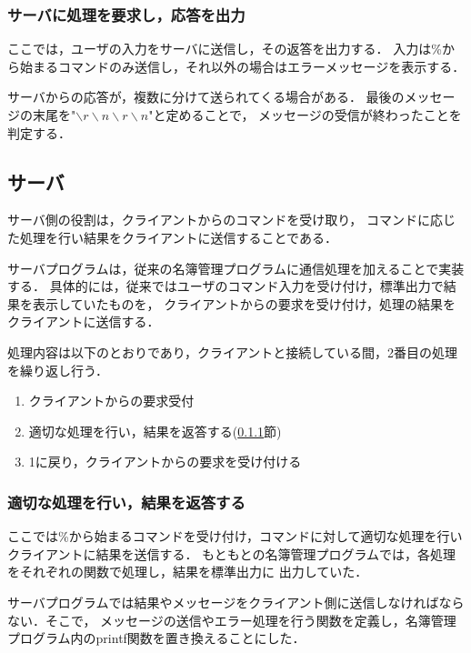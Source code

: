 \documentclass[11pt]{jarticle}
\begin{document}
\subsubsection{サーバに処理を要求し，応答を出力} \label{sec:process}

ここでは，ユーザの入力をサーバに送信し，その返答を出力する．
入力は\%から始まるコマンドのみ送信し，それ以外の場合はエラーメッセージを表示する．

サーバからの応答が，複数に分けて送られてくる場合がある．
最後のメッセージの末尾を"$\backslash r\backslash n\backslash r\backslash n$"と定めることで，
メッセージの受信が終わったことを判定する．

\subsection{サーバ}

サーバ側の役割は，クライアントからのコマンドを受け取り，
コマンドに応じた処理を行い結果をクライアントに送信することである．

サーバプログラムは，従来の名簿管理プログラムに通信処理を加えることで実装する．
具体的には，従来ではユーザのコマンド入力を受け付け，標準出力で結果を表示していたものを，
クライアントからの要求を受け付け，処理の結果をクライアントに送信する．

処理内容は以下のとおりであり，クライアントと接続している間，2番目の処理を繰り返し行う．

\begin{enumerate}
    \item クライアントからの要求受付
    \item 適切な処理を行い，結果を返答する(\ref{sec:response}節)
    \item 1に戻り，クライアントからの要求を受け付ける
\end{enumerate}


\subsubsection{適切な処理を行い，結果を返答する} \label{sec:response}

ここでは\%から始まるコマンドを受け付け，コマンドに対して適切な処理を行いクライアントに結果を送信する．
もともとの名簿管理プログラムでは，各処理をそれぞれの関数で処理し，結果を標準出力に
出力していた．

サーバプログラムでは結果やメッセージをクライアント側に送信しなければならない．そこで，
メッセージの送信やエラー処理を行う関数を定義し，名簿管理プログラム内のprintf関数を置き換えることにした．
\end{document}
